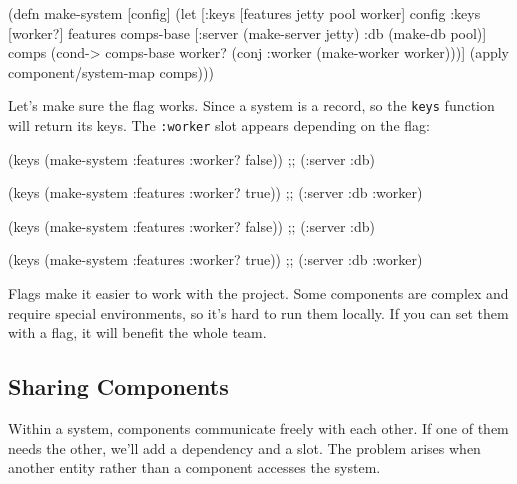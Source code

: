 \else

\begin{english}
  \begin{clojure}
(defn make-system [config]
  (let [{:keys [features jetty pool worker]} config
        {:keys [worker?]} features
        comps-base [:server (make-server jetty)
                    :db (make-db pool)]
        comps (cond-> comps-base
                worker?
                (conj :worker (make-worker worker)))]
    (apply component/system-map comps)))
  \end{clojure}
\end{english}

\fi

Let's make sure the flag works. Since a system is a record, so the \verb|keys| function will return its keys. The \verb|:worker| slot appears depending on the flag:

\ifnarrow

\begin{english}
  \begin{clojure}
(keys (make-system
        {:features {:worker? false}}))
;; (:server :db)

(keys (make-system
        {:features {:worker? true}}))
;; (:server :db :worker)
  \end{clojure}
\end{english}

\else

\begin{english}
  \begin{clojure}
(keys (make-system {:features {:worker? false}}))
;; (:server :db)

(keys (make-system {:features {:worker? true}}))
;; (:server :db :worker)
  \end{clojure}
\end{english}

\fi

Flags make it easier to work with the project. Some components are complex and require special environments, so it's hard to run them locally. If you can set them with a flag, it will benefit the whole team.

\subsection{Sharing Components}


Within a system, components communicate freely with each other. If one of them needs the other, we'll add a dependency and a slot. The problem arises when another entity rather than a component accesses the system.

